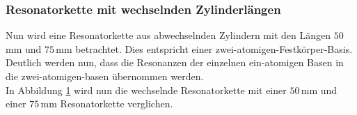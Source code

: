 \subsubsection*{Resonatorkette mit wechselnden Zylinderlängen}
Nun wird eine Resonatorkette aus abwechselnden Zylindern mit den Längen $50\,$mm und $75\,$mm betrachtet.
Dies entspricht einer zwei-atomigen-Festkörper-Basis. Deutlich werden nun, dass die Resonanzen der einzelnen ein-atomigen Basen in 
die zwei-atomigen-basen übernommen werden.\\
In Abbildung \ref{fig:abwech_zylin} wird nun die wechselnde Resonatorkette mit einer $50\,$mm und einer $75\,$mm Resonatorkette verglichen.

\begin{figure}[H]
    \centering
    \hfil
    \hfil 
    \caption{}
    \label{fig:abwech_zylin}
\end{figure}

